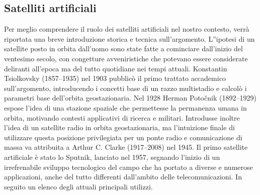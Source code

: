 \documentclass[12pt,a4paper,oneside]{book}
\begin{document}
			\subsection{Satelliti artificiali}
			Per meglio comprendere il ruolo dei satelliti artificiali nel nostro contesto, verrà riportata una breve introduzione storica e tecnica sull'argomento. L''ipotesi di un satellite posto in orbita dall'uomo sono state fatte a cominciare dall'inizio del ventesimo secolo, con congetture avveniristiche che potevano essere considerate deliranti all'epoca ma del tutto quotidiane nei tempi attuali. Konstantin Tsiolkovsky (1857–1935) nel 1903 pubblicò il primo trattato accademico sull'argomento, introducendo i concetti base di un razzo multistadio e calcolò i parametri base dell'orbita geostazionaria. Nel 1928 Herman Potočnik (1892–1929) espose l'idea di una stazione spaziale che permettesse la permanenza umana in orbita, motivando contesti applicativi di ricerca e militari. Introdusse inoltre l'idea di un satellite radio in orbita geostazionaria, ma l'intuizione finale di utilizzare questa posizione privilegiata per un ponte radio e comunicazione di massa va attribuita a Arthur C. Clarke (1917–2008) nel 1945. Il primo satellite artificiale è stato lo Sputnik, lanciato nel 1957, segnando l'inizio di un irrefrenabile sviluppo tecnologico del campo che ha portato a diverse e numerose applicazioni, anche del tutto differenti dall'ambito delle telecomunicazioni. In seguito un elenco degli attuali principali utilizzi.
\end{document}
